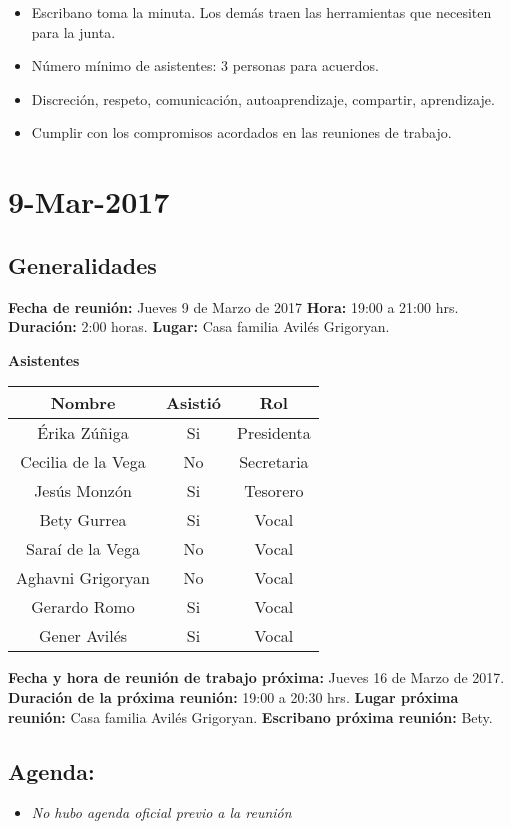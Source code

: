 \documentclass[]{book}
\providecommand{\tightlist}{%
  \setlength{\itemsep}{0pt}\setlength{\parskip}{0pt}}
\begin{document}
\begin{itemize}
\tightlist
\item
  Escribano toma la minuta. Los demás traen las herramientas que
  necesiten para la junta.
\item
  Número mínimo de asistentes: 3 personas para acuerdos.
\item
  Discreción, respeto, comunicación, autoaprendizaje, compartir,
  aprendizaje.
\item
  Cumplir con los compromisos acordados en las reuniones de trabajo.
\end{itemize}

\section{9-Mar-2017}\label{mar-2017-1}

\subsection{Generalidades}\label{generalidades-2}

\textbf{Fecha de reunión:} Jueves 9 de Marzo de 2017 \textbf{Hora:}
19:00 a 21:00 hrs. \textbf{Duración:} 2:00 horas. \textbf{Lugar:} Casa
familia Avilés Grigoryan.

\textbf{Asistentes}

\begin{longtable}[]{@{}ccc@{}}
\toprule
Nombre & Asistió & Rol\tabularnewline
\midrule
\endhead
Érika Zúñiga & Si & Presidenta\tabularnewline
Cecilia de la Vega & No & Secretaria\tabularnewline
Jesús Monzón & Si & Tesorero\tabularnewline
Bety Gurrea & Si & Vocal\tabularnewline
Saraí de la Vega & No & Vocal\tabularnewline
Aghavni Grigoryan & No & Vocal\tabularnewline
Gerardo Romo & Si & Vocal\tabularnewline
Gener Avilés & Si & Vocal\tabularnewline
\bottomrule
\end{longtable}

 \textbf{Fecha y hora de reunión de trabajo próxima:} Jueves 16 de Marzo
de 2017. \textbf{Duración de la próxima reunión:} 19:00 a 20:30 hrs.
\textbf{Lugar próxima reunión:} Casa familia Avilés Grigoryan.
\textbf{Escribano próxima reunión:} Bety.

\subsection{Agenda:}\label{agenda-2}

\begin{itemize}
\tightlist
\item
  \emph{No hubo agenda oficial previo a la reunión}
\end{itemize}
\end{document}
